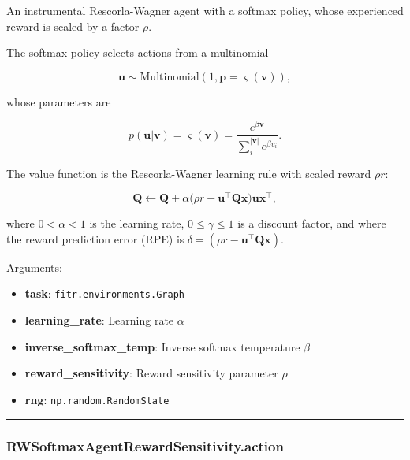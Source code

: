 \begin{Shaded}
\begin{Highlighting}[]
\end{Highlighting}
\end{Shaded}

An instrumental Rescorla-Wagner agent with a softmax policy, whose
experienced reward is scaled by a factor \(\rho\).

The softmax policy selects actions from a multinomial

\[
\mathbf u \sim \mathrm{Multinomial}(1, \mathbf p=\varsigma(\mathbf v)),
\]

whose parameters are

\[
p(\mathbf u|\mathbf v) = \varsigma(\mathbf v) = \frac{e^{\beta \mathbf v}}{\sum_{i}^{|\mathbf v|} e^{\beta v_i}}.
\]

The value function is the Rescorla-Wagner learning rule with scaled
reward \(\rho r\):

\[
\mathbf Q \gets \mathbf Q + \alpha \big(\rho r - \mathbf u^\top \mathbf Q \mathbf x \big) \mathbf u \mathbf x^\top,
\]

where \(0 < \alpha < 1\) is the learning rate, \(0 \leq \gamma \leq 1\)
is a discount factor, and where the reward prediction error (RPE) is
\(\delta = (\rho r - \mathbf u^\top \mathbf Q \mathbf x)\).

Arguments:

\begin{itemize}
\tightlist
\item
  \textbf{task}: \texttt{fitr.environments.Graph}
\item
  \textbf{learning\_rate}: Learning rate \(\alpha\)
\item
  \textbf{inverse\_softmax\_temp}: Inverse softmax temperature \(\beta\)
\item
  \textbf{reward\_sensitivity}: Reward sensitivity parameter \(\rho\)
\item
  \textbf{rng}: \texttt{np.random.RandomState}
\end{itemize}

\begin{center}\rule{0.5\linewidth}{\linethickness}\end{center}

\subsubsection{RWSoftmaxAgentRewardSensitivity.action}\label{rwsoftmaxagentrewardsensitivity.action}

